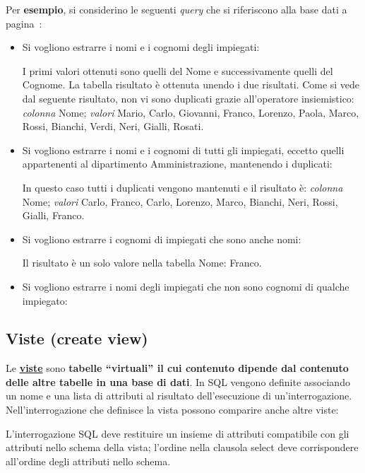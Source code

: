 \documentclass[a4paper]{article}
\newcommand{\dquotes}[1]{``#1''}
\begin{document}
	\noindent
	Per \textcolor{Green4}{\textbf{esempio}}, si considerino le seguenti \emph{query} che si riferiscono alla base dati a pagina~\pageref{img: select dbms}:
	\begin{itemize}
		\item Si vogliono estrarre i nomi e i cognomi degli impiegati:
		
		I primi valori ottenuti sono quelli del \textsf{Nome} e successivamente quelli del \textsf{Cognome}. La tabella risultato è ottenuta unendo i due risultati. Come si vede dal seguente risultato, non vi sono duplicati grazie all'operatore insiemistico: \emph{colonna} \textsf{Nome}; \emph{valori} \textsf{Mario, Carlo, Giovanni, Franco, Lorenzo, Paola, Marco, Rossi, Bianchi, Verdi, Neri, Gialli, Rosati}.\newpage
		
		\item Si vogliono estrarre i nomi e i cognomi di tutti gli impiegati, eccetto quelli appartenenti al dipartimento Amministrazione, mantenendo i duplicati:
		
		In questo caso tutti i duplicati vengono mantenuti e il risultato è: \emph{colonna} \textsf{Nome}; \emph{valori} \textsf{Carlo, Franco, Carlo, Lorenzo, Marco, Bianchi, Neri, Rossi, Gialli, Franco}.
		
		\item Si vogliono estrarre i cognomi di impiegati che sono anche nomi:
		
		Il risultato è un solo valore nella tabella \textsf{Nome}: \textsf{Franco}.
		
		\item Si vogliono estrarre i nomi degli impiegati che non sono cognomi di qualche impiegato:
		
	\end{itemize}\newpage
	
	\subsection{Viste (\textsf{create view})}
	
	Le \textbf{\underline{viste}} sono \textbf{tabelle \dquotes{virtuali} il cui contenuto dipende dal contenuto delle altre tabelle in una base di dati}. In SQL vengono definite associando un nome e una lista di attributi al risultato dell'esecuzione di un'interrogazione. Nell'interrogazione che definisce la vista possono comparire anche altre viste:
	
	L'interrogazione SQL deve restituire un insieme di attributi compatibile con gli attributi nello schema della vista; l'ordine nella clausola \textsf{select} deve corrispondere all'ordine degli attributi nello schema.\newline
	
\end{document}
